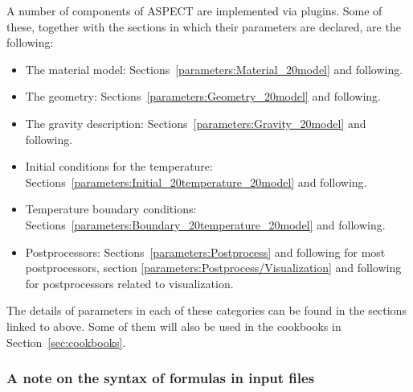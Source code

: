 \documentclass{article}
\newcommand{\aspect}{\textsc{ASPECT}}
\begin{document}
\begin{itemize}
  A number of components of \aspect{} are implemented via plugins. Some of
  these, together with the sections in which their parameters are declared, are
  the following:
  \begin{itemize}
  \item The material model:
    Sections~\ref{parameters:Material_20model} and following.
  \item The geometry:
    Sections~\ref{parameters:Geometry_20model} and following.
  \item The gravity description:
    Sections~\ref{parameters:Gravity_20model} and following.
  \item Initial conditions for the temperature:
    Sections~\ref{parameters:Initial_20temperature_20model} and following.
  \item Temperature boundary conditions:
    Sections~\ref{parameters:Boundary_20temperature_20model} and following.
  \item Postprocessors:
    Sections~\ref{parameters:Postprocess} and following for most postprocessors,
    section \ref{parameters:Postprocess/Visualization} and following for
    postprocessors related to visualization.
  \end{itemize}
\end{itemize}

The details of parameters in each of these categories can be found in the
sections linked to above. Some of them will also be used in the cookbooks in
Section~\ref{sec:cookbooks}.


\subsubsection{A note on the syntax of formulas in input files}
\label{sec:muparser-format}
\end{document}
